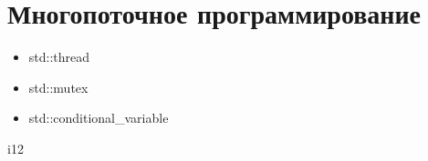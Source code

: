 \section{Многопоточное программирование}
\begin{itemize}[noitemsep]
	\item std::thread
	\item std::mutex
	\item std::conditional\_variable
\end{itemize}
i12
